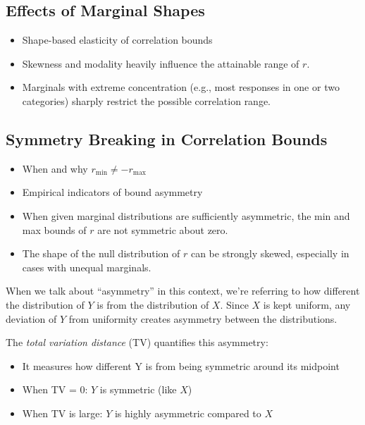 \documentclass[
  12pt,
]{article}
\providecommand{\tightlist}{%
  \setlength{\itemsep}{0pt}\setlength{\parskip}{0pt}}\usepackage{longtable,booktabs,array}
\theoremstyle{plain}
\theoremstyle{definition}
\theoremstyle{remark}
\begin{document}
\subsection{Effects of Marginal
Shapes}\label{effects-of-marginal-shapes}

\begin{itemize}
\item
  Shape-based elasticity of correlation bounds\\
\item
  Skewness and modality heavily influence the attainable range of \(r\).
\item
  Marginals with extreme concentration (e.g., most responses in one or
  two categories) sharply restrict the possible correlation range.
\end{itemize}

\subsection{Symmetry Breaking in Correlation
Bounds}\label{symmetry-breaking-in-correlation-bounds}

\begin{itemize}
\item
  When and why \(r_{\min} \neq -r_{\max}\)
\item
  Empirical indicators of bound asymmetry
\item
  When given marginal distributions are sufficiently asymmetric, the min
  and max bounds of \(r\) are not symmetric about zero.
\item
  The shape of the null distribution of \(r\) can be strongly skewed,
  especially in cases with unequal marginals.
\end{itemize}

When we talk about ``asymmetry'' in this context, we're referring to how
different the distribution of \(Y\) is from the distribution of \(X\).
Since \(X\) is kept uniform, any deviation of \(Y\) from uniformity
creates asymmetry between the distributions.

The \emph{total variation distance} (TV) quantifies this asymmetry:

\begin{itemize}
\tightlist
\item
  It measures how different Y is from being symmetric around its
  midpoint
\item
  When TV = 0: \(Y\) is symmetric (like \(X\))
\item
  When TV is large: \(Y\) is highly asymmetric compared to \(X\)
\end{itemize}
\end{document}
